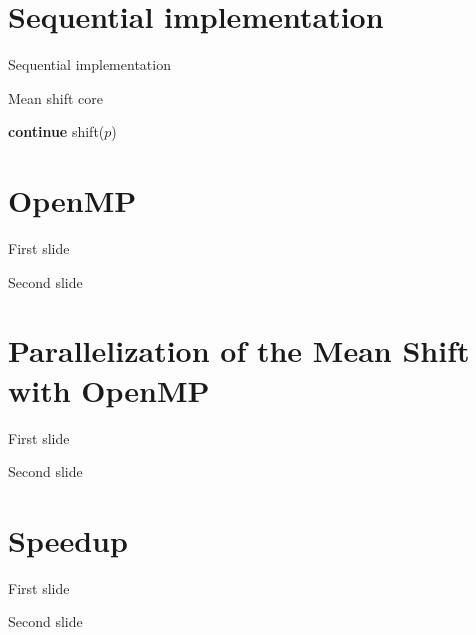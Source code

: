 \documentclass{beamer}
\begin{document}
\section{Sequential implementation}


\begin{frame}{Sequential implementation}

\begin{algorithm}[H]
\caption{Mean shift core}
\begin{algorithmic}[1]

                    \State \textbf{continue}
                \EndIf
            \State shift($p$)
            \EndFor
    \EndWhile

\end{algorithmic}
\end{algorithm}

\end{frame}


\section{OpenMP}


\begin{frame}{First slide}
\end{frame}


\begin{frame}{Second slide}
\end{frame}


\section{Parallelization of the Mean Shift with OpenMP}


\begin{frame}{First slide}
\end{frame}


\begin{frame}{Second slide}
\end{frame}


\section{Speedup}


\begin{frame}{First slide}
\end{frame}


\begin{frame}{Second slide}
\end{frame}
\end{document}
